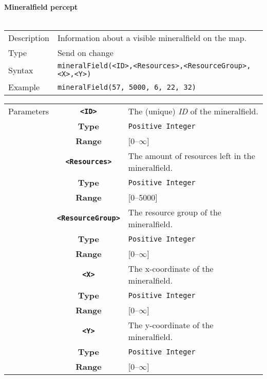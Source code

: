 \newpage
\noindent
\textbf{Mineralfield percept}\\
\\
\begin{tabularx}{\textwidth}{lX}
 Description & Information about a visible mineralfield on the map. \\
 Type & Send on change \\
 Syntax & \verb|mineralField(<ID>,<Resources>,<ResourceGroup>,<X>,<Y>)| \\
 Example & \verb|mineralField(57, 5000, 6, 22, 32)| \\ 
 \end{tabularx}
 \begin{tabularx}{\textwidth}{l | c | p{8cm}|}
 \cline{2-3} 
 Parameters & \textbf{\verb|<ID>|} & The (unique) \textit{ID} of the mineralfield.\\
            & \textbf{Type} & \verb|Positive Integer| \\
            & \textbf{Range} & [0--$\infty$] \\
            \cline{2-3} 
            & \textbf{\verb|<Resources>|} & The amount of resources left in the mineralfield.\\
            & \textbf{Type} & \verb|Positive Integer| \\
            & \textbf{Range} & [0--5000] \\
            \cline{2-3} 
            & \textbf{\verb|<ResourceGroup>|} & The resource group of the mineralfield. \\
            & \textbf{Type} & \verb|Positive Integer| \\
            & \textbf{Range} & [0--$\infty$] \\
            \cline{2-3} 
            & \textbf{\verb|<X>|} & The x-coordinate of the mineralfield.\\
            & \textbf{Type} & \verb|Positive Integer| \\
            & \textbf{Range} & [0--$\infty$] \\
            \cline{2-3} 
            & \textbf{\verb|<Y>|} & The y-coordinate of the mineralfield.\\
            & \textbf{Type} & \verb|Positive Integer| \\
            & \textbf{Range} & [0--$\infty$] \\
            \cline{2-3} 
\end{tabularx} \\

